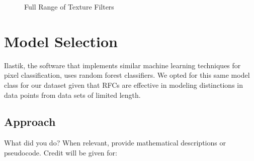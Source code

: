 \documentclass[11pt]{article}
\begin{document}
\begin{figure}[H]
{{{            }
        }\hfill{
        }
    }\caption{Full Range of Texture Filters}
    \label{fig:texture}
\end{figure}


\section{Model Selection}

Ilastik, the software that implements similar machine learning techniques for pixel classification,
uses random forest classifiers. We opted for this same model class for our dataset given that RFCs
are effective in modeling distinctions in data points from data sets of limited length.

\subsection{Approach}

What did you do? When relevant, provide mathematical descriptions or pseudocode. Credit will be
given for:
\end{document}
